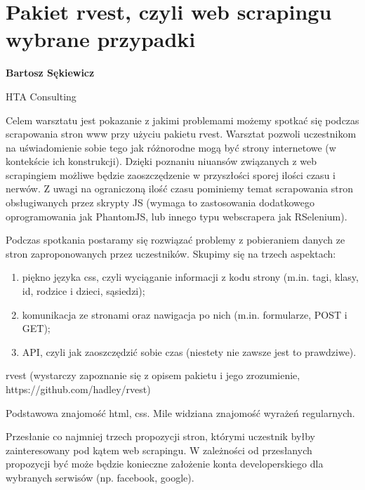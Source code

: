 \documentclass[\main/boa.tex]{subfiles}
\begin{document}
\section{Pakiet rvest, czyli web scrapingu wybrane przypadki}

\begin{minipage}{0.915\textwidth}
\centering
{\bf {} Bartosz Sękiewicz}
\end{minipage}

\vskip 0.3cm

\begin{affiliations}
\begin{minipage}{0.915\textwidth}
\centering
\large HTA Consulting  \\[2pt]
\end{minipage}
\end{affiliations}

\vskip 0.8cm

\opiswarsztatu Celem warsztatu jest pokazanie z jakimi problemami możemy spotkać się podczas scrapowania stron www przy użyciu pakietu rvest. Warsztat pozwoli uczestnikom na uświadomienie sobie tego jak różnorodne mogą być strony internetowe (w kontekście ich konstrukcji). Dzięki poznaniu niuansów związanych z web scrapingiem możliwe będzie zaoszczędzenie w przyszłości sporej ilości czasu i nerwów. Z uwagi na ograniczoną ilość czasu pominiemy temat scrapowania stron obsługiwanych przez skrypty JS (wymaga to zastosowania dodatkowego oprogramowania jak PhantomJS, lub innego typu webscrapera jak RSelenium).

\planwarsztatu Podczas spotkania postaramy się rozwiązać problemy z pobieraniem danych ze stron zaproponowanych przez uczestników. Skupimy się na trzech aspektach:
\begin{enumerate}
\item piękno języka css, czyli wyciąganie informacji z kodu strony (m.in. tagi, klasy, id, rodzice i dzieci, sąsiedzi);
\item komunikacja ze stronami oraz nawigacja po nich (m.in. formularze, POST i GET);
\item API, czyli jak zaoszczędzić sobie czas (niestety nie zawsze jest to prawdziwe).
\end{enumerate}	 

\pakiety rvest (wystarczy zapoznanie się z opisem pakietu i jego zrozumienie, https://github.com/hadley/rvest)

\umiejetnosci Podstawowa znajomość html, css. Mile widziana znajomość wyrażeń regularnych.

\wymagania Przesłanie co najmniej trzech propozycji stron, którymi uczestnik byłby zainteresowany pod kątem web scrapingu. W zależności od przesłanych propozycji być może będzie konieczne założenie konta developerskiego dla wybranych serwisów (np. facebook, google).
\end{document}

